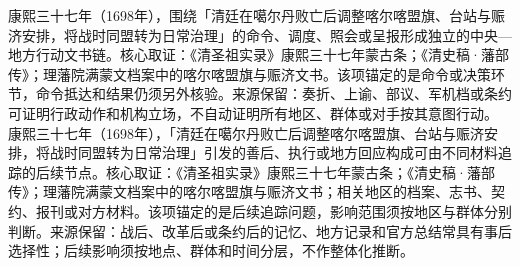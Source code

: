康熙三十七年（1698年），围绕「清廷在噶尔丹败亡后调整喀尔喀盟旗、台站与赈济安排，将战时同盟转为日常治理」的命令、调度、照会或呈报形成独立的中央—地方行动文书链。核心取证：《清圣祖实录》康熙三十七年蒙古条；《清史稿·藩部传》；理藩院满蒙文档案中的喀尔喀盟旗与赈济文书。该项锚定的是命令或决策环节，命令抵达和结果仍须另外核验。来源保留：奏折、上谕、部议、军机档或条约可证明行政动作和机构立场，不自动证明所有地区、群体或对手按其意图行动。
康熙三十七年（1698年），「清廷在噶尔丹败亡后调整喀尔喀盟旗、台站与赈济安排，将战时同盟转为日常治理」引发的善后、执行或地方回应构成可由不同材料追踪的后续节点。核心取证：《清圣祖实录》康熙三十七年蒙古条；《清史稿·藩部传》；理藩院满蒙文档案中的喀尔喀盟旗与赈济文书；相关地区的档案、志书、契约、报刊或对方材料。该项锚定的是后续追踪问题，影响范围须按地区与群体分别判断。来源保留：战后、改革后或条约后的记忆、地方记录和官方总结常具有事后选择性；后续影响须按地点、群体和时间分层，不作整体化推断。
